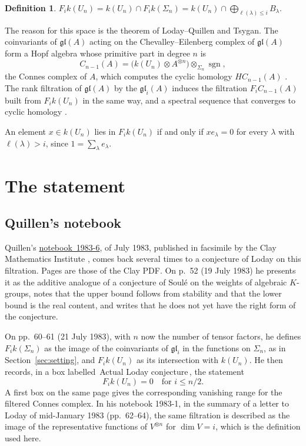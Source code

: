 \documentclass[11pt,a4paper]{amsart}
\theoremstyle{definition}
\newtheorem{definition}[theorem]{Definition}
\theoremstyle{remark}
\newcommand{\q}[1]{\guillemotleft\,#1\,\guillemotright}
\newcommand{\gl}{\mathfrak{gl}}
\newcommand{\sgn}{\operatorname{sgn}}
\newcommand{\nb}[2]{\href{https://www.claymath.org/library/Quillen/Working_papers/quillen\%20#1/#1-#2.pdf}{notebook~#1-#2}}
\begin{document}
\begin{definition}
$F_i k(U_n) = k(U_n) \cap F_i k(\Sigma_n) = k(U_n) \cap \bigoplus_{\ell(\lambda) \le i} B_\lambda$.
\end{definition}

The reason for this space is the theorem of Loday--Quillen and Tsygan. The coinvariants of $\gl(A)$ acting on the Chevalley--Eilenberg complex of $\gl(A)$ form a Hopf algebra whose primitive part in degree $n$ is
\[
C_{n-1}(A) = \bigl(k(U_n) \otimes A^{\otimes n}\bigr) \otimes_{\Sigma_n} \sgn,
\]
the Connes complex of $A$, which computes the cyclic homology $HC_{n-1}(A)$ \cite[\S\S6.6--6.9]{lq}. The rank filtration of $\gl(A)$ by the $\gl_i(A)$ induces the filtration $F_i C_{n-1}(A)$ built from $F_i k(U_n)$ in the same way, and a spectral sequence that converges to cyclic homology \cite[Prop.~6.13]{lq}.

An element $x \in k(U_n)$ lies in $F_i k(U_n)$ if and only if $x e_\lambda = 0$ for every $\lambda$ with $\ell(\lambda) > i$, since $1 = \sum_\lambda e_\lambda$.

\section{The statement}\label{sec:statement}

\subsection*{Quillen's notebook}
Quillen's \nb{1983}{6}, of July 1983, published in facsimile by the Clay Mathematics Institute \cite{clay}, comes back several times to a conjecture of Loday on this filtration. Pages are those of the Clay PDF. On p.~52 (19 July 1983) he presents it as the additive analogue of a conjecture of Soulé on the weights of algebraic $K$-groups, notes that the upper bound follows from stability and that the lower bound is the real content, and writes that he does not yet have the right form of the conjecture.

On pp.~60--61 (21 July 1983), with $n$ now the number of tensor factors, he defines $F_i k(\Sigma_n)$ as the image of the coinvariants of $\gl_i$ in the functions on $\Sigma_n$, as in Section~\ref{sec:setting}, and $F_i k(U_n)$ as its intersection with $k(U_n)$. He then records, in a box labelled \q{Actual Loday conjecture}, the statement
\[
F_i k(U_n) = 0 \quad \text{for } i \le n/2 .
\]
A first box on the same page gives the corresponding vanishing range for the filtered Connes complex. In his notebook 1983-1, in the summary of a letter to Loday of mid-January 1983 (pp.~62--64), the same filtration is described as the image of the representative functions of $V^{\otimes n}$ for $\dim V = i$, which is the definition used here.
\end{document}
